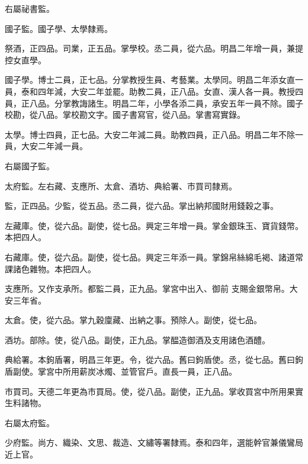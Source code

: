 \begin{pinyinscope}
 右屬祕書監。



 國子監。國子學、太學隸焉。



 祭酒，正四品。司業，正五品。掌學校。丞二員，從六品。明昌二年增一員，兼提控女直學。



 國子學。博士二員，正七品。分掌教授生員、考藝業。太學同。明昌二年添女直一員，泰和四年減，大安二年並罷。助教二員，正八品。女直、漢人各一員。教授四員，正八品。分掌教誨諸生。明昌二年，小學各添二員，承安五年一員不除。國子校勘，從八品。掌校勘文字。國子書寫官，從八品。掌書寫實錄。



 太學。博士四員，正七品。大安二年減二員。助教四員，正八品。明昌二年不除一員，大安二年減一員。



 右屬國子監。



 太府監。左右藏、支應所、太倉、酒坊、典給署、市買司隸焉。



 監，正四品。少監，從五品。丞二員，從六品。掌出納邦國財用錢穀之事。



 左藏庫。使，從六品。副使，從七品。興定三年增一員。掌金銀珠玉、寶貨錢幣。本把四人。



 右藏庫。使，從六品。副使，從七品。興定三年添一員。掌錦帛絲綿毛褐、諸道常課諸色雜物。本把四人。



 支應所。又作支承所。都監二員，正九品。掌宮中出入、御前
 支賜金銀幣帛。大安三年省。



 太倉。使，從六品。掌九穀廩藏、出納之事。預除人。副使，從七品。



 酒坊。部除。使，從八品。副使，正九品。掌醖造御酒及支用諸色酒醴。



 典給署。本鉤盾署，明昌三年更。令，從六品。舊曰鉤盾使。丞，從七品。舊曰鉤盾副使。掌宮中所用薪炭冰燭、並管官戶。直長一員，正八品。



 市買司。天德二年更為市買局。使，從八品。副使，正九品。掌收買宮中所用果實生料諸物。



 右屬太府監。



 少府監。尚方、織染、文思、裁造、文繡等署隸焉。泰和四年，選能幹官兼儀鸞局近上官。




\end{pinyinscope}
